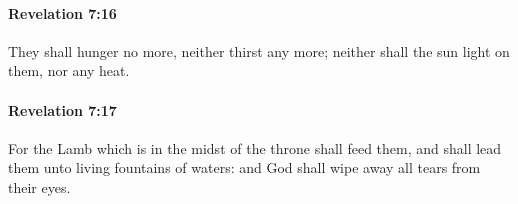 		\paragraph{Revelation 7:16} %
			\label{REVELATIONNT-7-16}

			They shall hunger no more, neither thirst any more; neither shall the sun light on them, nor any heat.

			\begin{framed}
			\scriptsize
				\begin{compactdesc}
					\item[SBLG] 
				\end{compactdesc}
			\end{framed}

		\paragraph{Revelation 7:17} %
			\label{REVELATIONNT-7-17}

			For the Lamb which is in the midst of the throne shall feed them, and shall lead them unto living fountains of waters: and God shall wipe away all tears from their eyes.

